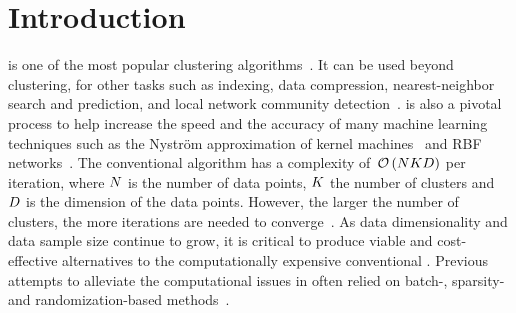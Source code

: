 \section{Introduction}

\kmeans is one of the most popular clustering algorithms~\cite{hartigan1979algorithm,jain2010data}. It can be used beyond clustering, for other tasks such as indexing, data compression,  nearest-neighbor search and prediction, and local network community detection~\cite{muja2014scalable,van2016local}. \kmeans is also a pivotal process to help increase the speed and the accuracy of many machine learning techniques such as the Nyström approximation of kernel machines~\cite{si2016computationally} and RBF networks~\cite{que2016back}.
%
The  conventional  \kmeans  algorithm  has  a  complexity  of~$\mathcal{O}\left (N K D\right )$ per iteration, where $N$ is the number of data points, $K$ the number of clusters and $D$ is the dimension of the data points.
However, the larger the number of clusters, the more iterations are needed to converge~\cite{arthur2006slow}.
%
As data dimensionality and data sample size continue to grow, it is critical to produce viable and cost-effective alternatives to the computationally expensive conventional \kmeans. 
Previous attempts to alleviate the computational issues in \kmeans often relied on batch-, sparsity- and randomization-based methods~\cite{Sculley2010Web,boutsidis2014randomized,shen2017compressed,liu2017sparse}.

